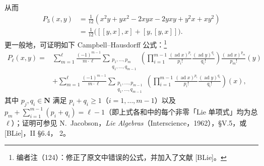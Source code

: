 从而
\[
\begin{aligned}
P_3(x,y)&=\frac1{12}(x^2y+yx^2-2xyx-2yxy+y^2x+xy^2)\\
&=\frac1{12}\bigl([[y,x],x]+[y,[y,x]]\bigr).
\end{aligned}
\]
更一般地，可证明如下 Campbell--Hausdorff 公式：\footnote{编者注（124）：修正了原文中错误的公式，并加入了文献 [BLie]。}
\[
\begin{aligned}
P_\ell(x,y)
={}&\sum_{m=1}^{\ell}\frac{(-1)^{m-1}}{m\cdot\ell}
\sum_{\substack{p_1,\ldots,p_m\\q_1,\ldots,q_{m-1}}}
\left(\prod_{i=1}^{m-1}\frac{(\operatorname{ad}x)^{p_i}}{p_i!}\frac{(\operatorname{ad}y)^{q_i}}{q_i!}\right)
\frac{(\operatorname{ad}x)^{p_m}}{p_m!}(y)\\
&+\sum_{m=1}^{\ell}\frac{(-1)^{m-1}}{m\cdot\ell}
\sum_{\substack{p_1,\ldots,p_{m-1}\\q_1,\ldots,q_{m-1}}}
\left(\prod_{i=1}^{m-1}\frac{(\operatorname{ad}x)^{p_i}}{p_i!}\frac{(\operatorname{ad}y)^{q_i}}{q_i!}\right)(x),
\end{aligned}
\]
其中 $p_j,q_i\in\mathbf N$ 满足 $p_i+q_i\geq1$（$i=1,\ldots,m-1$）以及 $p_m+\sum_{i=1}^{m-1}(p_i+q_i)=\ell-1$（即上式各和中的每个非零「Lie 单项式」均为总 $\ell$）；证明可参见 N.~Jacobson，\textit{Lie Algebras}（Interscience，1962），§V.5，或 [BLie]，II §6.4， 2。

